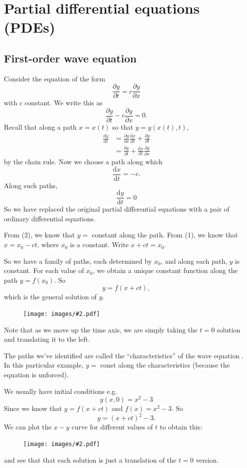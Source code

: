 \documentclass[a4paper]{article}
\theoremstyle{definition}
\renewcommand{\d}{\mathrm{d}}
\let\stdsection\section
\renewcommand\section{\newpage\stdsection}
\newcommand{\img}[2][]{\begin{figure}[ht]\centering\texttt{[image: images/\#2.pdf]}\end{figure}}
\begin{document}
\section{Partial differential equations (PDEs)}
\subsection{First-order wave equation}
Consider the equation of the form
\[
\frac{\partial y}{\partial t} = c\frac{\partial y}{\partial x}
\]
with $c$ constant. We write this as
\[
\frac{\partial y}{\partial t} - c\frac{\partial y}{\partial x} = 0.
\]
Recall that along a path $x = x(t)$ so that $y = y(x(t), t)$,
\begin{align*}
  \frac{\d y}{\d t} &= \frac{\partial y}{\partial x}\frac{\d x}{\d t} + \frac{\partial y}{\partial t}\\
  &= \frac{\partial y}{\partial t} + \frac{\d x}{\d t}\frac{\partial y}{\partial x}
\end{align*}
by the chain rule. Now we choose a path along which
\[
\frac{\d x}{\d t} = -c. \tag{1}
\] Along such paths,
\[
\frac{\d y}{\d t} = 0 \tag{2}
\]
So we have replaced the original partial differential equations with a pair of ordinary differential equations.

From (2), we know that $y = $ constant along the path. From (1), we know that $x = x_0 - ct$, where $x_0$ is a constant. Write $x + ct = x_0$.

So we have a family of paths, each determined by $x_0$, and along each path, $y$ is constant. For each value of $x_0$, we obtain a unique constant function along the path $y = f(x_0)$. So
\[
y = f(x + ct),
\]
which is the general solution of $y$.

\img{de_31}

Note that as we move up the time axis, we are simply taking the $t = 0$ solution and translating it to the left.

The paths we've identified are called the ``characteristics'' of the wave equation . In this particular example, $y =$ const along the characteristics (because the equation is unforced).

We usually have initial conditions e.g.
\[
y(x, 0) = x^2 - 3
\]
Since we know that $y = f(x + ct)$ and $f(x) = x^2 - 3$. So
\[
y = (x + ct)^2 - 3.
\]
We can plot the $x-y$ curve for different values of $t$ to obtain this:

\img[width=200pt]{de_32} %

and see that that each solution is just a translation of the $t = 0$ version.
\end{document}
